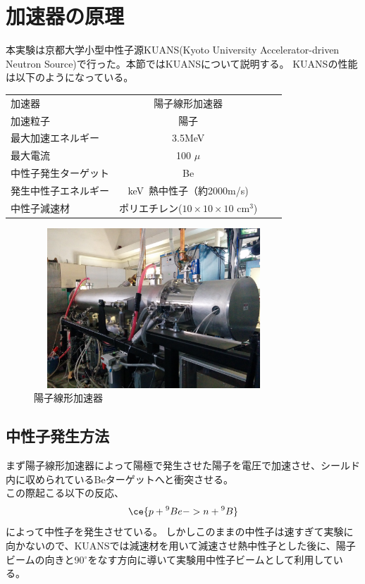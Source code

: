 \section{加速器の原理}
本実験は京都大学小型中性子源KUANS(Kyoto University Accelerator-driven Neutron Source)で行った。本節ではKUANSについて説明する。
KUANSの性能は以下のようになっている。


\begin{table}[htb]
\centering
\begin{tabular}{lcrr}
加速器&陽子線形加速器\\
加速粒子&陽子\\
最大加速エネルギー&3.5MeV\\
最大電流&100 $\mu$ \\
中性子発生ターゲット&Be\\
発生中性子エネルギー&keV~熱中性子（約2000m/s)\\
中性子減速材&ポリエチレン($10\times10\times10$ cm$^3$)\\
\end{tabular}
\end{table}

\begin{figure}[h]
\begin{center}
\includegraphics[width=9cm,height=6cm]{accelerator/accphoto.jpg}
\caption{陽子線形加速器}
\end{center}
\end{figure}

\subsection{中性子発生方法}
まず陽子線形加速器によって陽極で発生させた陽子を電圧で加速させ、シールド内に収められているBeターゲットへと衝突させる。\\
この際起こる以下の反応、\begin{equation}
\ce{p + {^{9}Be} ->n + {^{9}B}}\end{equation}
によって中性子を発生させている。
しかしこのままの中性子は速すぎて実験に向かないので、KUANSでは減速材を用いて減速させ熱中性子とした後に、陽子ビームの向きと90$^{\circ}$をなす方向に導いて実験用中性子ビームとして利用している。
